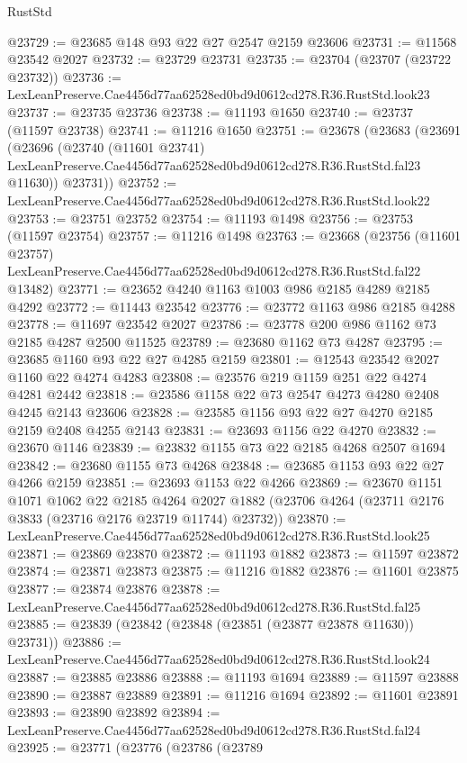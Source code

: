 \begin{lexlean}{RustStd}
\begin{coremodule}
@23729 := @23685 @148 @93 @22 @27 @2547 @2159 @23606
@23731 := @11568 @23542 @2027
@23732 := @23729 @23731
@23735 := @23704 (@23707 (@23722 @23732))
@23736 := LexLeanPreserve.Cae4456d77aa62528ed0bd9d0612cd278.R36.RustStd.look23
@23737 := @23735 @23736
@23738 := @11193 @1650
@23740 := @23737 (@11597 @23738)
@23741 := @11216 @1650
@23751 := @23678
    (@23683
      (@23691
        (@23696
          (@23740
            (@11601 @23741)
            LexLeanPreserve.Cae4456d77aa62528ed0bd9d0612cd278.R36.RustStd.fal23
            @11630))
        @23731))
@23752 := LexLeanPreserve.Cae4456d77aa62528ed0bd9d0612cd278.R36.RustStd.look22
@23753 := @23751 @23752
@23754 := @11193 @1498
@23756 := @23753 (@11597 @23754)
@23757 := @11216 @1498
@23763 := @23668
    (@23756
      (@11601 @23757)
      LexLeanPreserve.Cae4456d77aa62528ed0bd9d0612cd278.R36.RustStd.fal22
      @13482)
@23771 := @23652 @4240 @1163 @1003 @986 @2185 @4289 @2185 @4292
@23772 := @11443 @23542
@23776 := @23772 @1163 @986 @2185 @4288
@23778 := @11697 @23542 @2027
@23786 := @23778 @200 @986 @1162 @73 @2185 @4287 @2500 @11525
@23789 := @23680 @1162 @73 @4287
@23795 := @23685 @1160 @93 @22 @27 @4285 @2159
@23801 := @12543 @23542 @2027 @1160 @22 @4274 @4283
@23808 := @23576 @219 @1159 @251 @22 @4274 @4281 @2442
@23818 := @23586 @1158 @22 @73 @2547 @4273 @4280 @2408 @4245 @2143 @23606
@23828 := @23585 @1156 @93 @22 @27 @4270 @2185 @2159 @2408 @4255 @2143
@23831 := @23693 @1156 @22 @4270
@23832 := @23670 @1146
@23839 := @23832 @1155 @73 @22 @2185 @4268 @2507 @1694
@23842 := @23680 @1155 @73 @4268
@23848 := @23685 @1153 @93 @22 @27 @4266 @2159
@23851 := @23693 @1153 @22 @4266
@23869 := @23670
    @1151
    @1071
    @1062
    @22
    @2185
    @4264
    @2027
    @1882
    (@23706 @4264 (@23711 @2176 @3833 (@23716 @2176 @23719 @11744) @23732))
@23870 := LexLeanPreserve.Cae4456d77aa62528ed0bd9d0612cd278.R36.RustStd.look25
@23871 := @23869 @23870
@23872 := @11193 @1882
@23873 := @11597 @23872
@23874 := @23871 @23873
@23875 := @11216 @1882
@23876 := @11601 @23875
@23877 := @23874 @23876
@23878 := LexLeanPreserve.Cae4456d77aa62528ed0bd9d0612cd278.R36.RustStd.fal25
@23885 := @23839 (@23842 (@23848 (@23851 (@23877 @23878 @11630)) @23731))
@23886 := LexLeanPreserve.Cae4456d77aa62528ed0bd9d0612cd278.R36.RustStd.look24
@23887 := @23885 @23886
@23888 := @11193 @1694
@23889 := @11597 @23888
@23890 := @23887 @23889
@23891 := @11216 @1694
@23892 := @11601 @23891
@23893 := @23890 @23892
@23894 := LexLeanPreserve.Cae4456d77aa62528ed0bd9d0612cd278.R36.RustStd.fal24
@23925 := @23771
    (@23776
      (@23786
        (@23789

\end{coremodule}
\end{lexlean}
